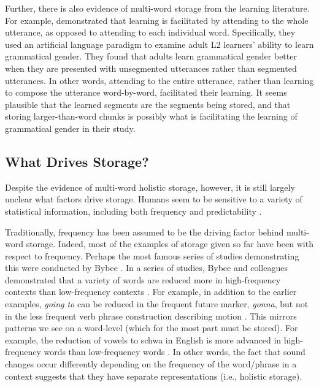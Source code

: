 \documentclass[
  authoryear,
  preprint,
  1p,
  onecolumn]{elsarticle}
\begin{document}
Further, there is also evidence of multi-word storage from the learning
literature. For example, \citet{siegelman2015} demonstrated that
learning is facilitated by attending to the whole utterance, as opposed
to attending to each individual word. Specifically, they used an
artificial language paradigm to examine adult L2 learners' ability to
learn grammatical gender. They found that adults learn grammatical
gender better when they are presented with unsegmented utterances rather
than segmented utterances. In other words, attending to the entire
utterance, rather than learning to compose the utterance word-by-word,
facilitated their learning. It seems plausible that the learned segments
are the segments being stored, and that storing larger-than-word chunks
is possibly what is facilitating the learning of grammatical gender in
their study.

\subsection{What Drives Storage?}\label{what-drives-storage}

Despite the evidence of multi-word holistic storage, however, it is
still largely unclear what factors drive storage. Humans seem to be
sensitive to a variety of statistical information, including both
frequency \citep[e.g.,][]{bybee1999, maye2000, kapatsinski2009, lee2015}
and predictability \citep[e.g,][]{olejarczuk2018, ramscar2013}.

Traditionally, frequency has been assumed to be the driving factor
behind multi-word storage. Indeed, most of the examples of storage given
so far have been with respect to frequency. Perhaps the most famous
series of studies demonstrating this were conducted by Bybee
\citep{bybee1999, bybee2003, bybee2001}. In a series of studies, Bybee
and colleagues demonstrated that a variety of words are reduced more in
high-frequency contexts than low-frequency contexts \citep[additionally
see][ for further discussion of
this]{kapatsinskiHierarchicalInferenceSound2021}. For example, in
addition to the earlier examples, \emph{going to} can be reduced in the
frequent future marker, \emph{gonna}, but not in the less frequent verb
phrase construction describing motion \citep[e.g., *\emph{gonna the
store},][]{bybee2003}. This mirrors patterns we see on a word-level
(which for the most part must be stored). For example, the reduction of
vowels to schwa in English is more advanced in high-frequency words than
low-frequency words \citep{hooper1976, bybee2003}. In other words, the
fact that sound changes occur differently depending on the frequency of
the word/phrase in a context suggests that they have separate
representations (i.e., holistic storage).
\end{document}
